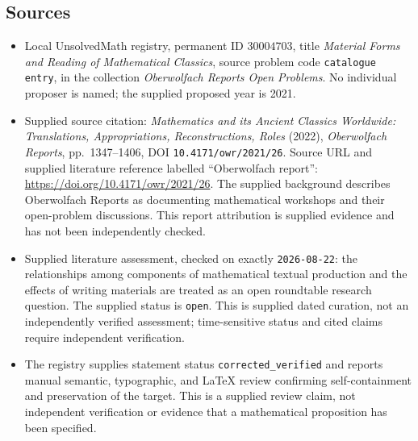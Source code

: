 \documentclass[11pt]{article}
\begin{document}
\subsection{Sources}
\begin{itemize}
\item Local UnsolvedMath registry, permanent ID \(30004703\), title \emph{Material Forms and Reading of Mathematical Classics}, source problem code \texttt{catalogue entry}, in the collection \emph{Oberwolfach Reports Open Problems}. No individual proposer is named; the supplied proposed year is 2021.
\item Supplied source citation: \emph{Mathematics and its Ancient Classics Worldwide: Translations, Appropriations, Reconstructions, Roles} (2022), \emph{Oberwolfach Reports}, pp.\ 1347--1406, DOI \texttt{10.4171/owr/2021/26}. Source URL and supplied literature reference labelled ``Oberwolfach report'': \url{https://doi.org/10.4171/owr/2021/26}. The supplied background describes Oberwolfach Reports as documenting mathematical workshops and their open-problem discussions. This report attribution is supplied evidence and has not been independently checked.
\item Supplied literature assessment, checked on exactly \texttt{2026-08-22}: the relationships among components of mathematical textual production and the effects of writing materials are treated as an open roundtable research question. The supplied status is \texttt{open}. This is supplied dated curation, not an independently verified assessment; time-sensitive status and cited claims require independent verification.
\item The registry supplies statement status \texttt{corrected\_verified} and reports manual semantic, typographic, and LaTeX review confirming self-containment and preservation of the target. This is a supplied review claim, not independent verification or evidence that a mathematical proposition has been specified.
\end{itemize}
\end{document}
